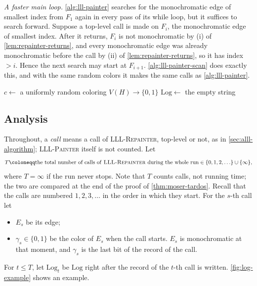 \emph{A faster main loop.} \autoref{alg:lll-painter} searches for the monochromatic edge of smallest index from \(F_{1}\) again in every pass of its while loop, but it suffices to search forward. Suppose a top-level call is made on \(F_{i}\), the monochromatic edge of smallest index. After it returns, \(F_{i}\) is not monochromatic by (i) of \autoref{lem:repainter-returns}, and every monochromatic edge was already monochromatic before the call by (ii) of \autoref{lem:repainter-returns}, so it has index \(> i\). Hence the next search may start at \(F_{i+1}\). \autoref{alg:lll-painter-scan} does exactly this, and with the same random colors it makes the same calls as \autoref{alg:lll-painter}.

\begin{algorithm}[H]
    \caption{\textsc{LLL-Painter-Scan}\((H)\)}\label{alg:lll-painter-scan}
    \(c \gets\) a uniformly random coloring \(V(H) \to \{0, 1\}\)\;
    \(\mathrm{Log} \gets\) the empty string\;
\end{algorithm}

\subsection{Analysis}\label{sec:alll-analysis}

Throughout, a \emph{call} means a call of \textsc{LLL-Repainter}, top-level or not, as in \autoref{sec:alll-algorithm}; \textsc{LLL-Painter} itself is not counted. Let
\[
    T \coloneqq \text{the total number of calls of \textsc{LLL-Repainter} during the whole run} \in \{0, 1, 2, \ldots\} \cup \{\infty\},
\]
where \(T = \infty\) if the run never stops. Note that \(T\) counts calls, not running time; the two are compared at the end of the proof of \autoref{thm:moser-tardos}. Recall that the calls are numbered \(1, 2, 3, \ldots\) in the order in which they start. For the \(s\)-th call let
\begin{itemize}
    \item \(E_{s}\) be its edge;
    \item \(\gamma_{s} \in \{0, 1\}\) be the color of \(E_{s}\) when the call starts. \(E_{s}\) is monochromatic at that moment, and \(\gamma_{s}\) is the last bit of the record of the call.
\end{itemize}
For \(t \le T\), let \(\mathrm{Log}_{t}\) be \(\mathrm{Log}\) right after the record of the \(t\)-th call is written. \autoref{fig:log-example} shows an example.

